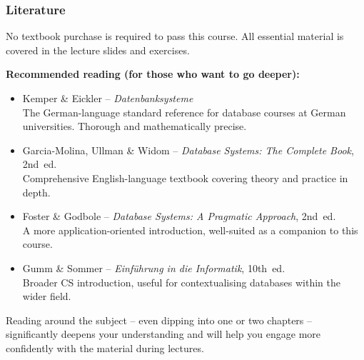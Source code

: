 \begin{frame}
  \frametitle{Literature}

  \begin{alertblock}{No textbook purchase is required to pass this course.}
    All essential material is covered in the lecture slides and exercises.
  \end{alertblock}

  \textbf{Recommended reading (for those who want to go deeper):}

  \begin{itemize}
    \item Kemper \& Eickler -- \textit{Datenbanksysteme}\\
          \footnotesize The German-language standard reference for database courses at German universities. Thorough and mathematically precise.\normalsize

    \item Garcia-Molina, Ullman \& Widom -- \textit{Database Systems: The Complete Book}, 2nd~ed.\\
          \footnotesize Comprehensive English-language textbook covering theory and practice in depth.\normalsize

    \item Foster \& Godbole -- \textit{Database Systems: A Pragmatic Approach}, 2nd~ed.\\
          \footnotesize A more application-oriented introduction, well-suited as a companion to this course.\normalsize

    \item Gumm \& Sommer -- \textit{Einführung in die Informatik}, 10th~ed.\\
          \footnotesize Broader CS introduction, useful for contextualising databases within the wider field.\normalsize
  \end{itemize}

  Reading around the subject -- even dipping into one or two chapters -- significantly deepens your understanding and will help you engage more confidently with the material during lectures.
\end{frame}
